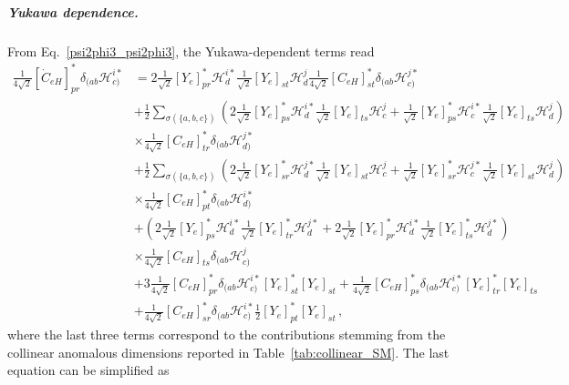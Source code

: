 \subparagraph{Yukawa dependence.}
From Eq.~\eqref{psi2phi3_psi2phi3}, the Yukawa-dependent terms read
\begin{align}
    \frac{1}{4\sqrt{2}}[\dot C_{eH}]^*_{pr} \delta_{(ab}\mathcal H_{c)}^{i*} &= 
     2\frac{1}{\sqrt{2}}[Y_e]^*_{pr}\mathcal H_d^{i*}\frac{1}{\sqrt{2}}[Y_e]_{st}\mathcal H_d^{j}\frac{1}{4\sqrt{2}}[C_{eH}]^*_{st}\delta_{(ab}\mathcal H_{c)}^{j*}
     \nonumber 
\\
    & + \frac{1}{2}\sum_{\sigma(\{a,b,c\})}
    \left(2\frac{1}{\sqrt{2}}[Y_e]^*_{ps}\mathcal H_d^{i*}\frac{1}{\sqrt{2}}[Y_e]_{ts}\mathcal H_c^j+\frac{1}{\sqrt{2}}[Y_e]^*_{ps}\mathcal H_c^{i*}\frac{1}{\sqrt{2}}[Y_e]_{ts}\mathcal H_d^j\right)\nonumber \\&\times \frac{1}{4\sqrt{2}}[C_{eH}]^*_{tr}\delta_{(ab}\mathcal H_{d)}^{j*}
    \nonumber \\
    & + \frac{1}{2}\sum_{\sigma(\{a,b,c\})}
    \left(2\frac{1}{\sqrt{2}}[Y_e]^*_{sr}\mathcal H_d^{j*}\frac{1}{\sqrt{2}}[Y_e]_{st}\mathcal H_c^j+\frac{1}{\sqrt{2}}[Y_e]^*_{sr}\mathcal H_c^{j*}\frac{1}{\sqrt{2}}[Y_e]_{st}\mathcal H_d^j\right)\nonumber \\&\times\frac{1}{4\sqrt{2}}[C_{eH}]^*_{pt}\delta_{(ab}\mathcal H_{d)}^{i*}\nonumber \\
    &+
    \left(2\frac{1}{\sqrt{2}}[Y_e]^*_{ps}\mathcal H_d^{i*}\frac{1}{\sqrt{2}}[Y_e]^*_{tr}\mathcal H_d^{j*} + 2 \frac{1}{\sqrt{2}}[Y_e]^*_{pr}\mathcal H_d^{i*}\frac{1}{\sqrt{2}}[Y_e]^*_{ts}\mathcal H_d^{j*}\right)\nonumber \\&\times\frac{1}{4\sqrt{2}}[C_{eH}]_{ts}\delta_{(ab}\mathcal H_{c)}^j
    \nonumber
\\
    &  + 3 \frac{1}{4\sqrt{2}}[C_{eH}]^*_{pr}\delta_{(ab}\mathcal H_{c)}^{i*} [Y_e]^*_{st}[Y_e]_{st} + \frac{1}{4\sqrt{2}}[C_{eH}]^*_{ps}\delta_{(ab}\mathcal H_{c)}^{i*}[Y_e]^*_{tr}[Y_e]_{ts}\nonumber \\&+ \frac{1}{4\sqrt{2}}[C_{eH}]^*_{sr}\delta_{(ab}\mathcal H_{c)}^{i*}\frac{1}{2}[Y_e]_{pt}^*[Y_e]_{st} \,,
\end{align}
where the last three terms correspond to the contributions stemming from the collinear anomalous dimensions reported in Table~\ref{tab:collinear_SM}.
The last equation can be simplified as
